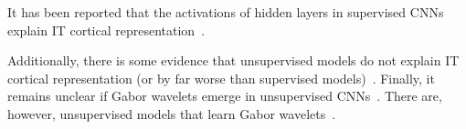 It has been reported that the activations of hidden layers in supervised \acp{CNN} explain \ac{IT} cortical representation~\citep{khaligh2014deep,cadieu2014deep}.

Additionally, there is some evidence that unsupervised models do not explain \ac{IT} cortical representation (or by far worse than supervised models)~\citep{khaligh2014deep}.
Finally, it remains unclear if Gabor wavelets emerge in unsupervised \acp{CNN}~\citep{han2019variational}.
There are, however, unsupervised models that learn Gabor wavelets~\citep{berkes2005slow}.

